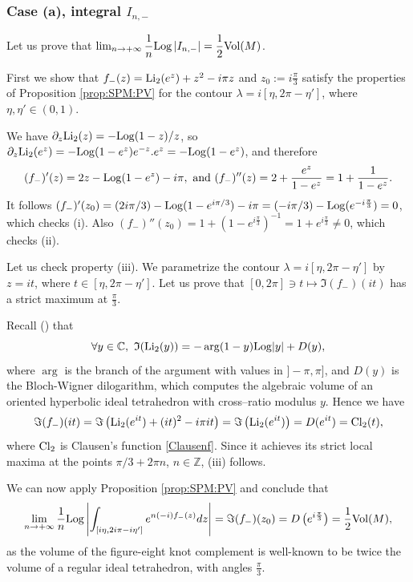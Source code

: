 \documentclass[11pt]{amsart}
\newcommand{\mz}{\mathbb{Z}}
\newcommand{\C}{\mathbb{C}}
\newcommand{\Log}{{\rm Log}}
\newcommand{\ra}{\rightarrow}
\begin{document}
{\subsubsection{Case (a), integral $I_{n,-}$}\label{sub:a:-}
Let us prove that $\lim_{n\ra +\infty}  \dfrac{1}{n}\Log \left \vert I_{n,-} \right \vert = \dfrac{1}{2} {\rm Vol}(M)$.


First we show that $f_-(z)=  {\rm Li}_2(e^{z})+z^2 - i\pi z$ and $\textstyle z_0:= {i \frac{\pi}{3}}$ satisfy the properties of Proposition \ref{prop:SPM:PV} for the contour $\lambda=i[\eta,2\pi-\eta']$, where $\eta,\eta' \in(0,1)$.

We have $\partial_z {\rm Li}_2(z) = -\Log(1-z)/z$, so $\partial_z {\rm Li}_2(e^{z}) = -\Log(1-e^{z})e^{-z}.e^{z}= -\Log(1-e^{z})$, and therefore
$$(f_-)'(z)= 2z -\Log(1-e^{z}) - i \pi,\ \text{and}\ (f_-)''(z)= 2 + \frac{e^z}{1-e^z}= 1 + \frac{1}{1-e^z}.$$ 
It follows $(f_-)'(z_0)=  (2i\pi/3)  -\Log(1-e^{i\pi/3}) - i \pi= (-i \pi/3) - \Log(e^{-i \frac{\pi}{3}})=0$, which checks (i). Also $(f_-)''(z_0)= 1 + (1-e^{i \frac{\pi}{3}})^{-1}=1+e^{i \frac{\pi}{3}} \neq 0$, which checks (ii).

Let us check property (iii). We parametrize the contour $\lambda=i[\eta,2\pi-\eta']$ by $z=i t$, where $t \in [\eta,2\pi-\eta']$. Let us prove that $[0,2\pi] \ni t \mapsto \Im(f_-)(it)$ has a strict maximum at $\textstyle\frac{\pi}{3}$.

Recall (\cite{Z}) that
\begin{equation}\label{BWdilogmars25}
\forall y \in \C, \ \mathfrak{I}({\rm Li}_2(y))   = -\arg(1-y)\Log\vert y\vert + D(y),
\end{equation}
where $\arg$ is the branch of the argument with values in $]-\pi,\pi]$, and $D(y)$ is the Bloch-Wigner dilogarithm, which computes the algebraic volume of an oriented hyperbolic ideal tetrahedron with cross--ratio modulus $y$. Hence we have
$$\Im(f_-)(it) = \Im\left ({\rm Li}_2(e^{it})+(it)^2 - i\pi it\right )
=\Im\left ({\rm Li}_2(e^{it})\right ) = D(e^{it})= {\rm Cl}_2(t),$$
where ${\rm Cl}_2$ is Clausen's function \eqref{Clausenf}. Since it achieves its strict local maxima at the points $\pi/3 + 2\pi n$, $n\in \mz$, (iii) follows.

We can now apply Proposition \ref{prop:SPM:PV}
and conclude that
 $$\lim_{n\ra +\infty}  \dfrac{1}{n}\Log \left \vert \int_{[i\eta,2i\pi-i\eta']}  e^{n(-i) f_{-}(z)} dz \right \vert 
 = \Im (f_-)(z_0) = D\left (e^{i\frac{\pi}{3}}\right )
 = \dfrac{1}{2} {\rm Vol}(M),$$
as the volume of the figure-eight knot complement is well-known to be twice the volume of a regular ideal tetrahedron, with angles $\textstyle \frac{\pi}{3}$.

}
\end{document}
